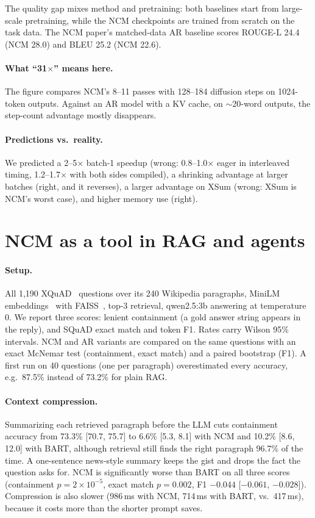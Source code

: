 \documentclass[11pt]{article}
\begin{document}
The quality gap mixes method and pretraining: both baselines start from large-scale
pretraining, while the NCM checkpoints are trained from scratch on the task data. The NCM
paper's matched-data AR baseline scores ROUGE-L 24.4 (NCM 28.0) and BLEU 25.2 (NCM 22.6).

\paragraph{What ``31$\times$'' means here.} The figure compares NCM's 8--11 passes with
128--184 diffusion steps on 1024-token outputs. Against an AR model with a KV cache, on
$\sim$20-word outputs, the step-count advantage mostly disappears.

\paragraph{Predictions vs.\ reality.} We predicted a 2--5$\times$ batch-1 speedup (wrong:
0.8--1.0$\times$ eager in interleaved timing, 1.2--1.7$\times$ with both sides compiled), a shrinking advantage at larger batches (right, and it reverses), a larger
advantage on XSum (wrong: XSum is NCM's worst case), and higher memory use (right).

\section{NCM as a tool in RAG and agents}
\paragraph{Setup.} All 1,190 XQuAD~\citep{xquad2020} questions over its 240 Wikipedia
paragraphs, MiniLM embeddings~\citep{sbert2019} with FAISS~\citep{faiss2019}, top-3
retrieval, qwen2.5:3b answering at temperature 0. We report three scores: lenient
containment (a gold answer string appears in the reply), and SQuAD exact match and token F1.
Rates carry Wilson 95\% intervals. NCM and AR variants are compared on the same questions
with an exact McNemar test (containment, exact match) and a paired bootstrap (F1).
A first run on 40 questions (one per paragraph) overestimated every accuracy, e.g.\ 87.5\%
instead of 73.2\% for plain RAG.

\paragraph{Context compression.} Summarizing each retrieved paragraph before the LLM cuts
containment accuracy from 73.3\% [70.7, 75.7] to 6.6\% [5.3, 8.1] with NCM and 10.2\%
[8.6, 12.0] with BART, although retrieval still finds the right paragraph 96.7\% of the time.
A one-sentence news-style summary keeps the gist and drops the fact the question asks for.
NCM is significantly worse than BART on all three scores (containment $p=2\times10^{-5}$,
exact match $p=0.002$, F1 $-0.044$ [$-0.061$, $-0.028$]). Compression is also slower
(986\,ms with NCM, 714\,ms with BART, vs.\ 417\,ms), because it costs more than the shorter
prompt saves.
\end{document}
